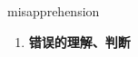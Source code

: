 
\begin{frame}
{\huge misapprehension}
\begin{center}
\begin{enumerate}\Large
  \item \textbf{错误的理解、判断}
\end{enumerate}
\end{center}
\end{frame}
